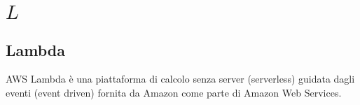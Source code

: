 \section{\quad$L\quad$}
\subsection{Lambda}
AWS Lambda è una piattaforma di calcolo senza server (serverless) guidata dagli eventi (event driven) fornita da Amazon come parte di Amazon Web Services. 

